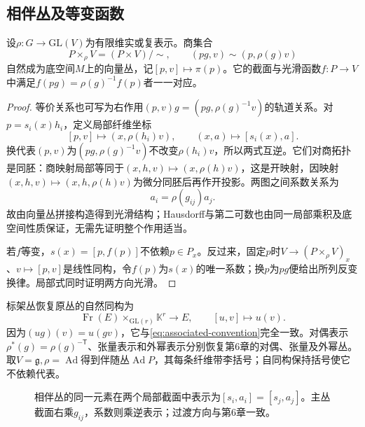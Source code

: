 \subsection{相伴丛及等变函数}
\begin{theorem}\label{thm:associated-bundle}
设$\rho:G\to\mathrm{GL}(V)$为有限维实或复表示。商集合
\begin{equation}\label{eq:associated-convention}
 P\times_\rho V=(P\times V)/\!\sim,\qquad
 (pg,v)\sim(p,\rho(g)v)
\end{equation}
自然成为底空间$M$上的向量丛，记$[p,v]\mapsto\pi(p)$。它的截面与光滑函数$f:P\to V$中满足$f(pg)=\rho(g)^{-1}f(p)$者一一对应。
\end{theorem}
\begin{proof}
等价关系也可写为右作用$(p,v)g=(pg,\rho(g)^{-1}v)$的轨道关系。对$p=s_i(x)h_i$，定义局部纤维坐标
\[
 [p,v]\longmapsto(x,\rho(h_i)v),\qquad
 (x,a)\longmapsto[s_i(x),a].
\]
换代表$(p,v)$为$(pg,\rho(g)^{-1}v)$不改变$\rho(h_i)v$，所以两式互逆。它们对商拓扑是同胚：商映射局部等同于$(x,h,v)\mapsto(x,\rho(h)v)$，这是开映射，因映射$(x,h,v)\mapsto(x,h,\rho(h)v)$为微分同胚后再作开投影。两图之间系数关系为
\begin{equation}\label{eq:associated-coefficients}
 a_i=\rho(g_{ij})a_j.
\end{equation}
故由向量丛拼接构造得到光滑结构；Hausdorff与第二可数也由同一局部乘积及底空间性质保证，无需先证明整个作用适当。

若$f$等变，$s(x)=[p,f(p)]$不依赖$p\in P_x$。反过来，固定$p$时$V\to(P\times_\rho V)_x$、$v\mapsto[p,v]$是线性同构，令$f(p)$为$s(x)$的唯一系数；换$p$为$pg$便给出所列反变换律。局部式同时证明两方向光滑。
\end{proof}

标架丛恢复原丛的自然同构为
\[
 \operatorname{Fr}(E)\times_{\mathrm{GL}(r)}\mathbb K^r\longrightarrow E,
 \qquad[u,v]\longmapsto u(v).
\]
因为$(ug)(v)=u(gv)$，它与\eqref{eq:associated-convention}完全一致。对偶表示$\rho^*(g)=\rho(g)^{-\mathsf T}$、张量表示和外幂表示分别恢复第6章的对偶、张量及外幂丛。取$V=\mathfrak g,\rho=\operatorname{Ad}$得到伴随丛$\operatorname{Ad}P$，其每条纤维带李括号；自同构保持括号使它不依赖代表。

\begin{figure}[htbp]
\centering
\caption{相伴丛的同一元素在两个局部截面中表示为$[s_i,a_i]=[s_j,a_j]$。主丛截面右乘$g_{ij}$，系数则乘逆表示；过渡方向与第6章一致。}
\label{fig:associated-coordinates}
\end{figure}

